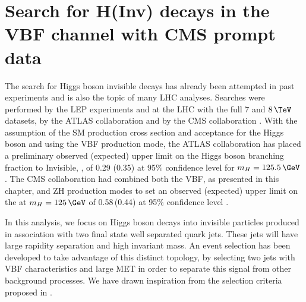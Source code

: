 \chapter{Search for H(Inv) decays in the VBF channel with CMS prompt data}
\label{CHAPTER:PromptDataAnalysis}



The search for Higgs boson invisible decays has already been attempted in past experiments and is also the topic of many \gls{LHC} analyses. Searches were performed by the \gls{LEP} experiments \cite{ARTICLE:LEPSearchesForInvisibleHiggsBosons,ARTICLE:LEPDELPHISearchesForInvisibleDecayingHiggsBosons,ARTICLE:LEPOPALSearchForInvisiblyDecayingHiggsBosons} and at the \gls{LHC} with the full 7 and $8\,\TeV$ datasets, by the \gls{ATLAS} collaboration \cite{ARTICLE:ATLASSearchForInvisibleDecaysHiggsBosonAssociatedZ,ARTICLE:ATLASSearchForDarkMatterWithHadronicallyWorZ,ARTICLE:ATLASMonoJetPlusMET,ARTICLE:ATLASVBFHiggsInvConfNote} and by the \gls{CMS} collaboration \cite{ARTICLE:CMSVBFHiggsToInvAndZHCombination}. With the assumption of the \gls{SM} production cross section and acceptance for the Higgs boson and using the \gls{VBF} production mode, the \gls{ATLAS} collaboration has placed a preliminary observed (expected) upper limit on the Higgs boson branching fraction to Invisible, \BRinv, of 0.29 (0.35) at 95\% confidence level for $m_H=125.5\,\GeV$ \cite{ARTICLE:ATLASVBFHiggsInvConfNote}. The \gls{CMS} collaboration had combined both the \gls{VBF}, as presented in this chapter, and ZH production modes to set an observed (expected) upper limit on the \BRinv at  $m_H=125\,\GeV$ of 0.58\,(0.44) at 95\% confidence level \cite{ARTICLE:CMSVBFHiggsToInvAndZHCombination}.

In this analysis, we focus on Higgs boson decays into invisible particles produced in association with two final state well separated quark jets. These jets will have large rapidity separation and high invariant mass. An event selection has been developed to take advantage of this distinct topology, by selecting two jets with \gls{VBF} characteristics and large \gls{MET} in order to separate this signal from other background processes. We have drawn inspiration from the selection criteria proposed in \cite{ARTICLE:Zeppenfeld_ObservingAnInvisibleHiggsboson}.

